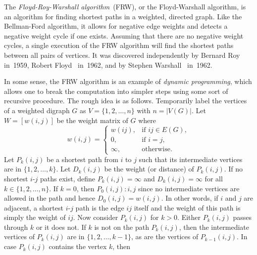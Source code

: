 The
\emph{Floyd-Roy-Warshall algorithm}~(FRW), or the
Floyd-Warshall algorithm, is an algorithm for finding shortest
paths in a weighted, directed graph. Like the
Bellman-Ford algorithm, it allows for
negative edge weights and detects a negative
weight cycle if one exists. Assuming that there
are no negative weight cycles, a single execution of the
FRW algorithm will find the shortest paths between all
pairs of vertices. It was discovered independently by Bernard
Roy~\cite{Roy1959} in~1959, Robert
Floyd~\cite{Floyd1962} in~1962, and by Stephen
Warshall~\cite{Warshall1962} in~1962.

In some sense, the FRW algorithm is an example of
\emph{dynamic programming}, which allows
one to break the computation into simpler steps using some sort of
recursive procedure. The rough idea is as
follows. Temporarily label the vertices of a weighted digraph $G$ as
$V = \{1,2,\dots,n\}$ with $n = |V(G)|$. Let $W = [w(i,j)]$ be the
weight matrix of $G$ where
\begin{equation}
\label{eqn:graph_algorithms:Floyd_Roy_Warshall_weight_matrix}
w(i,j)
=
\begin{cases}
w(ij), & \text{if $ij \in E(G)$}, \\
0, & \text{if $i = j$}, \\
\infty, & \text{otherwise}.
\end{cases}
\end{equation}
Let $P_k(i,j)$ be a shortest path from $i$ to $j$
such that its intermediate vertices are in $\{1, 2, \dots, k\}$. Let
$D_k(i,j)$ be the weight (or distance)
of $P_k(i,j)$. If no shortest $i$-$j$ paths exist, define
$P_k(i,j) = \infty$ and $D_k(i,j) = \infty$ for all
$k \in \{1, 2, \dots, n\}$. If $k = 0$, then $P_0(i,j): i, j$ since no
intermediate vertices are allowed in the path and hence
$D_0(i,j) = w(i,j)$. In other words, if $i$ and $j$ are adjacent, a
shortest $i$-$j$ path is the edge $ij$ itself and the weight of this
path is simply the weight of $ij$. Now consider $P_k(i,j)$ for
$k > 0$. Either $P_k(i,j)$ passes through $k$ or it does not. If $k$
is not on the path $P_k(i,j)$, then the intermediate vertices of
$P_k(i,j)$ are in  $\{1, 2, \dots, k-1\}$, as are the vertices of
$P_{k-1}(i,j)$. In case $P_k(i,j)$ contains the vertex $k$, then
